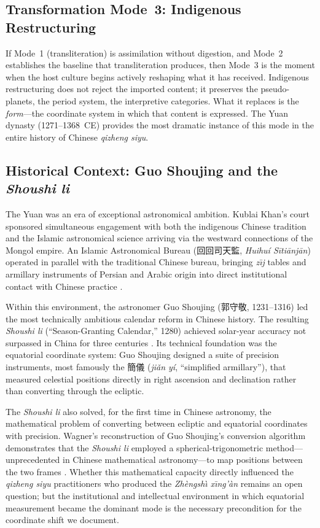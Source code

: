 \documentclass[10pt,a4paper]{article}
\newcommand{\zh}[1]{#1}
\begin{document}
\subsection*{Transformation Mode~3: Indigenous Restructuring}

If Mode~1 (transliteration) is assimilation without digestion, and
Mode~2 establishes the baseline that transliteration produces, then
Mode~3 is the moment when the host culture begins actively reshaping
what it has received.  Indigenous restructuring does not reject the
imported content; it preserves the pseudo-planets, the period system,
the interpretive categories.  What it replaces is the \emph{form}---the
coordinate system in which that content is expressed.  The Yuan dynasty
(1271--1368~CE) provides the most dramatic instance of this mode in
the entire history of Chinese \textit{qizheng siyu}.

\subsection*{Historical Context: Guo Shoujing and the \textit{Shoushi li}}

The Yuan was an era of exceptional astronomical ambition.  Kublai
Khan's court sponsored simultaneous engagement with both the indigenous
Chinese tradition and the Islamic astronomical science arriving via
the westward connections of the Mongol empire.  An Islamic Astronomical
Bureau (\zh{回回司天監}, \textit{Huihu\'{i} S\={i}ti\={a}nj\={a}n})
operated in parallel with the traditional Chinese bureau, bringing
\textit{z\={\i}j} tables and armillary instruments of Persian and
Arabic origin into direct institutional contact with Chinese
practice \citep{mak2024persian}.

Within this environment, the astronomer Guo Shoujing (\zh{郭守敬},
1231--1316) led the most technically ambitious calendar reform in
Chinese history.  The resulting \textit{Shoushi li}
(``Season-Granting Calendar,'' 1280) achieved solar-year
accuracy not surpassed in China for three centuries
\citep{sivin2009granting}.  Its technical foundation was the
equatorial coordinate system: Guo Shoujing designed a suite of
precision instruments, most famously the \zh{簡儀} (\textit{ji\v{a}n
y\'{i}}, ``simplified armillary''), that measured celestial positions
directly in right ascension and declination rather than converting
through the ecliptic.

The \textit{Shoushi li} also solved, for the first time in Chinese astronomy,
the mathematical problem of converting between ecliptic and equatorial
coordinates with precision.  Wagner's reconstruction of Guo Shoujing's
conversion algorithm demonstrates that the \textit{Shoushi li} employed a
spherical-trigonometric method---unprecedented in Chinese mathematical
astronomy---to map positions between the two frames
\citep{wagner2024gsj}.  Whether this mathematical capacity directly
influenced the \textit{qizheng siyu} practitioners who produced the
\textit{Zh\`{e}ngsh\`{\i} x\={\i}ng'\`{a}n} remains an open question; but the institutional and
intellectual environment in which equatorial measurement became the
dominant mode is the necessary precondition for the coordinate shift
we document.
\end{document}
